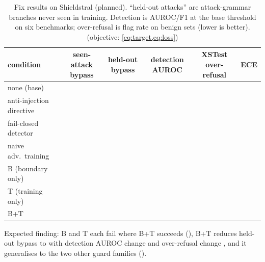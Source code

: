 \begin{table}[t]
  \centering
  \small
  \caption{Fix results on Shieldstral (planned). ``held-out attacks'' are attack-grammar branches never seen in training. Detection is AUROC/F1 at the base threshold on six benchmarks; over-refusal is flag rate on benign sets (lower is better). (objective: \cref{eq:target,eq:loss})}
  \label{tab:fix-main}
  \begin{tabular}{lccccc}
    \toprule
    condition & seen-attack bypass & held-out bypass & detection AUROC & XSTest over-refusal & ECE \\
    \midrule
    none (base)             & \tbd{} & \tbd{} & \tbd{} & \tbd{} & \tbd{} \\
    anti-injection directive& \tbd{} & \tbd{} & \tbd{} & \tbd{} & \tbd{} \\
    fail-closed detector    & \tbd{} & \tbd{} & \tbd{} & \tbd{} & \tbd{} \\
    naive adv.\ training    & \tbd{} & \tbd{} & \tbd{} & \tbd{} & \tbd{} \\
    B (boundary only)       & \tbd{} & \tbd{} & \tbd{} & \tbd{} & \tbd{} \\
    T (training only)       & \tbd{} & \tbd{} & \tbd{} & \tbd{} & \tbd{} \\
    B+T                     & \tbd{} & \tbd{} & \tbd{} & \tbd{} & \tbd{} \\
    \bottomrule
  \end{tabular}
\end{table}

Expected finding: B and T each fail where B+T succeeds (\tbd{}), B+T reduces held-out bypass to  with detection AUROC change \tbd{$\Delta$} and over-refusal change \tbd{$\Delta$}, and it generalises to the two other guard families (\tbd{}).
